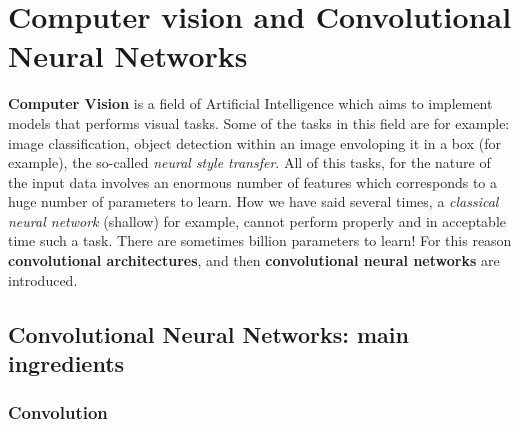 \chapter{Computer vision and Convolutional Neural Networks}

\textbf{Computer Vision} is a field of Artificial Intelligence which aims to implement models that performs visual tasks. Some of the tasks in this field are for example: image classification, object detection within an image envoloping it in a box (for example), the so-called \textit{neural style transfer}. All of this tasks, for the nature of the input data involves an enormous number of features which corresponds to a huge number of parameters to learn. How we have said several times, a \textit{classical neural network} (shallow) for example, cannot perform properly and in acceptable time such a task. There are sometimes billion parameters to learn! For this reason \textbf{convolutional architectures}, and then \textbf{convolutional neural networks} are introduced.

\section{Convolutional Neural Networks: main ingredients}

\subsection{Convolution}